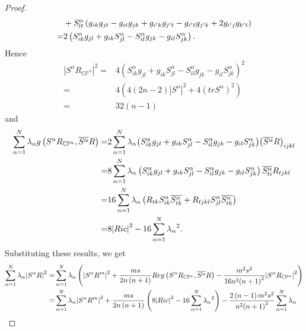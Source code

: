 \documentclass{amsart}
\theoremstyle{definition}
\theoremstyle{remark}
\numberwithin{equation}{section}
\begin{document}
\begin{proof}
\begin{align*}
   &+ S_{lt}^\alpha \left( {{g_{ik}}{g_{jt}} - {g_{it}}{g_{jk}} + {g_{i'k}}{g_{j't}} - {g_{i't}}{g_{j'k}} + 2{g_{i'j}}{g_{k't}}} \right) \hfill \\
   =& 2\left( {S_{ik}^\alpha {g_{jl}} + {g_{ik}}S_{jl}^\alpha  - S_{il}^\alpha {g_{jk}} - {g_{il}}S_{jk}^\alpha } \right).
\end{align*}
Hence
\begin{align*}
   {{\left| {{S^\alpha }{R_{\mathbb{C}{\mathbb{P}^n}}}} \right|}^2}  =& 4\left( {S_{ik}^\alpha {g_{jl}} + {g_{ik}}S_{jl}^\alpha  - S_{il}^\alpha {g_{jk}} - {g_{il}}S_{jk}^\alpha } \right)^2 \\
 =&4\left( {4\left( {2n - 2} \right){{\left| {{S^\alpha }} \right|}^2} + 4{{\left( {tr{S^\alpha }} \right)}^2}} \right)\\
 =& 32\left( {n - 1} \right)
\end{align*}
and
\begin{align*}
  \sum\limits_{\alpha  = 1}^N {{\lambda _\alpha }g\left( {{S^\alpha }{R_{\mathbb{C}{\mathbb{P}^n}}},{\overline {S^\alpha } } R} \right)}  =& 2\sum\limits_{\alpha  = 1}^N {{\lambda _\alpha }{{\left( {S_{ik}^\alpha {g_{jl}} + {g_{ik}}S_{jl}^\alpha  - S_{il}^\alpha {g_{jk}} - {g_{il}}S_{jk}^\alpha } \right)}}{{\left( {{\overline {S^\alpha } } R} \right)}_{ijkl}}}  \hfill \\
   =& 8\sum\limits_{\alpha  = 1}^N {{\lambda _\alpha }\left( {S_{ik}^\alpha {g_{jl}} + {g_{ik}}S_{jl}^\alpha  - S_{il}^\alpha {g_{jk}} - {g_{il}}S_{jk}^\alpha } \right){\overline {S_{ti}^\alpha } } {R_{tjkl}}}  \hfill \\
   =& 16\sum\limits_{\alpha  = 1}^N {{\lambda _\alpha }\left( {{R_{tk}}S_{ik}^\alpha {\overline {S_{tk}^\alpha } }  + {R_{tjkl}}S_{jl}^\alpha {\overline {S_{tk}^\alpha } } } \right)} \\
   =&8{\left| {Ric} \right|^2} - 16\sum\limits_{\alpha  = 1}^N {{\lambda _\alpha }^2} .
\end{align*}
Substituting these results, we get
\begin{align*}
  \sum\limits_{\alpha  = 1}^N {{\lambda _\alpha }{{\left| {{S^\alpha }R} \right|}^2}}  =& \sum\limits_{\alpha  = 1}^N {{\lambda _\alpha }\left( {{{\left| {{S^\alpha }{R^m}} \right|}^2} + \frac{{ms}}{{2n\left( {n + 1} \right)}}Reg\left( {{S^\alpha }{R_{\mathbb{C}{\mathbb{P}^n}}},\overline {{S^\alpha }} R} \right) - \frac{{{m^2}{s^2}}}{{16{n^2}{{\left( {n + 1} \right)}^2}}}{{\left| {{S^\alpha }{R_{\mathbb{C}{\mathbb{P}^n}}}} \right|}^2}} \right)}  \hfill \\
   =& \sum\limits_{\alpha  = 1}^N {{\lambda _\alpha }{{\left| {{S^\alpha }{R^m}} \right|}^2}}  + \frac{{ms}}{{2n\left( {n + 1} \right)}}\left( {8{{\left| {Ric} \right|}^2} - 16\sum\limits_{\alpha  = 1}^N {{\lambda _\alpha }^2} } \right) - \frac{{2\left( {n - 1} \right){m^2}{s^2}}}{{{n^2}{{\left( {n + 1} \right)}^2}}}\sum\limits_{\alpha  = 1}^N {{\lambda _\alpha }}  \hfill \\

\end{align*}
\end{proof}
\end{document}
